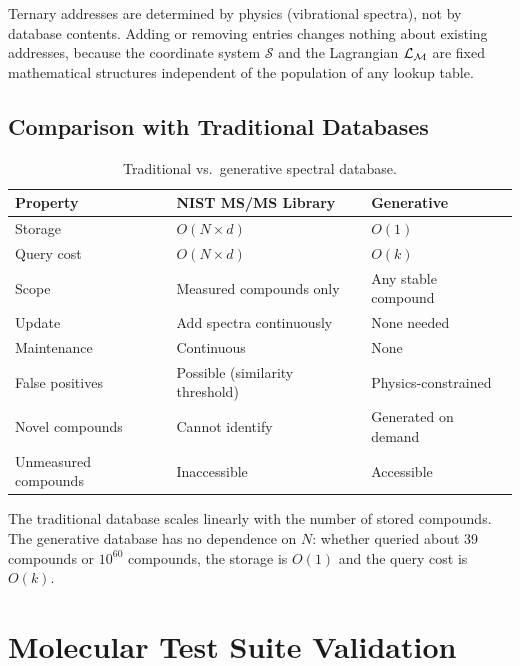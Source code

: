 \begin{corollary}
\label{cor:ch23-stability}
Ternary addresses are determined by physics (vibrational spectra), not by
database contents.  Adding or removing entries changes nothing about existing
addresses, because the coordinate system $\mathcal{S}$ and the Lagrangian
$\mathcal{L}_{\mathcal{M}}$ are fixed mathematical structures independent of the population
of any lookup table.
\end{corollary}

\subsection{Comparison with Traditional Databases}
\label{sec:ch23-comparison}

\begin{table}[htbp]
\centering
\caption{Traditional vs.\ generative spectral database.}
\label{tab:ch23-comparison}
\begin{tabular}{@{}lll@{}}
\toprule
\textbf{Property} & \textbf{NIST MS/MS Library} & \textbf{Generative} \\
\midrule
Storage & $O(N \times d)$ & $O(1)$ \\
Query cost & $O(N \times d)$ & $O(k)$ \\
Scope & Measured compounds only & Any stable compound \\
Update & Add spectra continuously & None needed \\
Maintenance & Continuous & None \\
False positives & Possible (similarity threshold) & Physics-constrained \\
Novel compounds & Cannot identify & Generated on demand \\
Unmeasured compounds & Inaccessible & Accessible \\
\bottomrule
\end{tabular}
\end{table}

The traditional database scales linearly with the number of stored compounds.
The generative database has no dependence on $N$: whether queried about 39
compounds or $10^{60}$ compounds, the storage is $O(1)$ and the query cost
is $O(k)$.

\section{Molecular Test Suite Validation}
\label{sec:ch23-validation}

